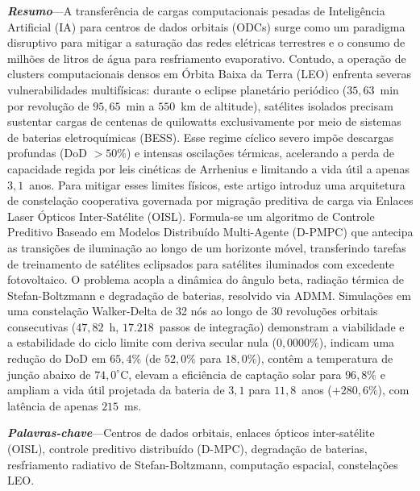 \documentclass[journal]{IEEEtran}
\begin{document}
\vspace{0.8ex}
\noindent\small{\textbf{\textit{Resumo}}---A transfer\^{e}ncia de cargas computacionais pesadas de Intelig\^{e}ncia Artificial (IA) para centros de dados orbitais (ODCs) surge como um paradigma disruptivo para mitigar a satura\c{c}\~{a}o das redes el\'{e}tricas terrestres e o consumo de milh\~{o}es de litros de \'{a}gua para resfriamento evaporativo. Contudo, a opera\c{c}\~{a}o de clusters computacionais densos em \'{O}rbita Baixa da Terra (LEO) enfrenta severas vulnerabilidades multif\'{i}sicas: durante o eclipse planet\'{a}rio peri\'{o}dico ($35,63$~min por revolu\c{c}\~{a}o de $95,65$~min a $550$~km de altitude), sat\'{e}lites isolados precisam sustentar cargas de centenas de quilowatts exclusivamente por meio de sistemas de baterias eletroqu\'{i}micas (BESS). Esse regime c\'{i}clico severo imp\~{o}e descargas profundas (DoD $> 50\%$) e intensas oscila\c{c}\~{o}es t\'{e}rmicas, acelerando a perda de capacidade regida por leis cin\'{e}ticas de Arrhenius e limitando a vida \'{u}til a apenas $3,1$~anos. Para mitigar esses limites f\'{i}sicos, este artigo introduz uma arquitetura de constela\c{c}\~{a}o cooperativa governada por migra\c{c}\~{a}o preditiva de carga via Enlaces Laser \'{O}pticos Inter-Sat\'{e}lite (OISL). Formula-se um algoritmo de Controle Preditivo Baseado em Modelos Distribu\'{i}do Multi-Agente (D-PMPC) que antecipa as transi\c{c}\~{o}es de ilumina\c{c}\~{a}o ao longo de um horizonte m\'{o}vel, transferindo tarefas de treinamento de sat\'{e}lites eclipsados para sat\'{e}lites iluminados com excedente fotovoltaico. O problema acopla a din\^{a}mica do \^{a}ngulo beta, radia\c{c}\~{a}o t\'{e}rmica de Stefan-Boltzmann e degrada\c{c}\~{a}o de baterias, resolvido via ADMM. Simula\c{c}\~{o}es em uma constela\c{c}\~{a}o Walker-Delta de 32 n\'{o}s ao longo de 30 revolu\c{c}\~{o}es orbitais consecutivas ($47,82$~h, $17.218$~passos de integra\c{c}\~{a}o) demonstram a viabilidade e a estabilidade do ciclo limite com deriva secular nula ($0,0000\%$), indicam uma redu\c{c}\~{a}o do DoD em $65,4\%$ (de $52,0\%$ para $18,0\%$), cont\^{e}m a temperatura de jun\c{c}\~{a}o abaixo de $74,0^\circ$C, elevam a efici\^{e}ncia de capta\c{c}\~{a}o solar para $96,8\%$ e ampliam a vida \'{u}til projetada da bateria de $3,1$ para $11,8$~anos ($+280,6\%$), com lat\^{e}ncia de apenas $215$~ms.}

\vspace{0.8ex}
\noindent\small{\textbf{\textit{Palavras-chave}}---Centros de dados orbitais, enlaces \'{o}pticos inter-sat\'{e}lite (OISL), controle preditivo distribu\'{i}do (D-MPC), degrada\c{c}\~{a}o de baterias, resfriamento radiativo de Stefan-Boltzmann, computa\c{c}\~{a}o espacial, constela\c{c}\~{o}es LEO.}
\end{document}
